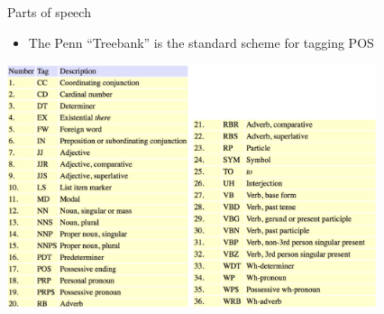 \documentclass[english]{beamer}
\begin{document}
\begin{frame}{Parts of speech}
\begin{itemize}
\item The Penn ``Treebank'' is the standard scheme for tagging POS
\end{itemize}
\begin{centering}
\includegraphics[height=2.8in]{Images/fig13}
\end{centering}
\end{frame}
\end{document}

